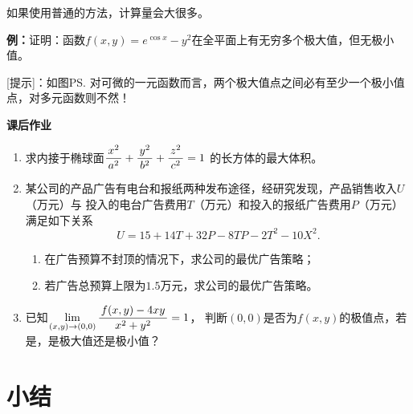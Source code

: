 如果使用普通的方法，计算量会大很多。

{\bf 例：}证明：函数$f(x,y)=e^{\cos x}-y^2$在全平面上有无穷多个极大值，但无极小值。

[提示]：如图\ps{对可微的一元函数而言，两个极大值点之间必有至少一个极小值点，对多元函数则不然！}
\begin{center}
\end{center}

\begin{ext}
	{\bf 课后作业}
	\begin{enumerate}
	  \item 求内接于椭球面$\displaystyle\frac{\,{x^2}\,}{\,{a^2}\,}+\displaystyle\frac{\,{y^2}\,}{\,{b^2}\,}+\displaystyle\frac{\,{z^2}\,}{\,{c^2}\,}=1$
	  的长方体的最大体积。
	  \item 某公司的产品广告有电台和报纸两种发布途径，经研究发现，产品销售收入$U$（万元）与
	  投入的电台广告费用$T$（万元）和投入的报纸广告费用$P$（万元）满足如下关系
	  $$U=15+14T+32P-8TP-2T^2-10X^2.$$
	  \begin{enumerate}[(1)]
	    \item 在广告预算不封顶的情况下，求公司的最优广告策略；
	    \item 若广告总预算上限为$1.5$万元，求公司的最优广告策略。
	  \end{enumerate}
	  \item 已知$\lim\limits_{(x,y)\to(0,0)}\displaystyle\frac{\,{f(x,y)-4xy}\,}{\,{x^2+y^2}\,}=1$，
	  判断$(0,0)$是否为$f(x,y)$的极值点，若是，是极大值还是极小值？
	\end{enumerate}
\end{ext}

\section{小结}

